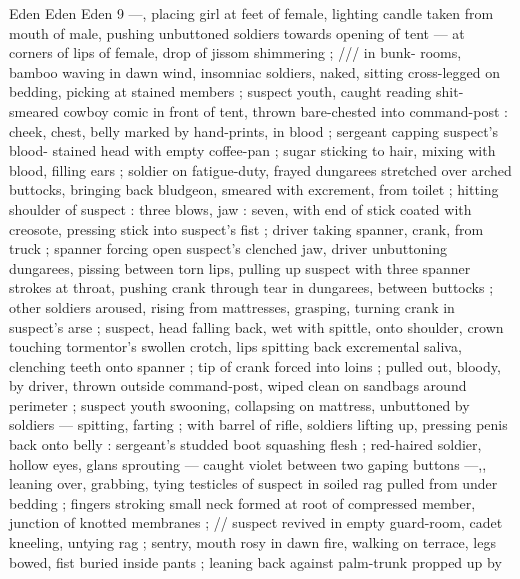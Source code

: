 Eden Eden Eden 9
—, placing girl at feet of female, lighting candle taken from mouth
of male, pushing unbuttoned soldiers towards opening of tent — at
corners of lips of female, drop of jissom shimmering ; /// in bunk-
rooms, bamboo waving in dawn wind, insomniac soldiers, naked,
sitting cross-legged on bedding, picking at stained members ;
suspect youth, caught reading shit-smeared cowboy comic in front of
tent, thrown bare-chested into command-post : cheek, chest, belly
marked by hand-prints, in blood ; sergeant capping suspect's blood-
stained head with empty coffee-pan ; sugar sticking to hair, mixing
with blood, filling ears ; soldier on fatigue-duty, frayed dungarees
stretched over arched buttocks, bringing back bludgeon, smeared
with excrement, from toilet ; hitting shoulder of suspect : three
blows, jaw : seven, with end of stick coated with creosote, pressing
stick into suspect's fist ; driver taking spanner, crank, from truck ;
spanner forcing open suspect's clenched jaw, driver unbuttoning
dungarees, pissing between torn lips, pulling up suspect with three
spanner strokes at throat, pushing crank through tear in dungarees,
between buttocks ; other soldiers aroused, rising from mattresses,
grasping, turning crank in suspect's arse ; suspect, head falling back,
wet with spittle, onto shoulder, crown touching tormentor's swollen
crotch, lips spitting back excremental saliva, clenching teeth onto
spanner ; tip of crank forced into loins ; pulled out, bloody, by driver,
thrown outside command-post, wiped clean on sandbags around
perimeter ; suspect youth swooning, collapsing on mattress,
unbuttoned by soldiers — spitting, farting ; with barrel of rifle,
soldiers lifting up, pressing penis back onto belly : sergeant's
studded boot squashing flesh ; red-haired soldier, hollow eyes, glans
sprouting — caught violet between two gaping buttons —,, leaning
over, grabbing, tying testicles of suspect in soiled rag pulled from
under bedding ; fingers stroking small neck formed at root of
compressed member, junction of knotted membranes ; // suspect
revived in empty guard-room, cadet kneeling, untying rag ; sentry,
mouth rosy in dawn fire, walking on terrace, legs bowed, fist buried
inside pants ; leaning back against palm-trunk propped up by

